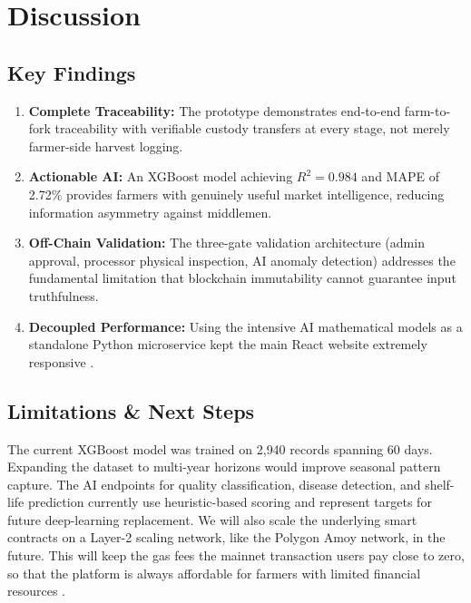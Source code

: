 \documentclass[conference]{IEEEtran}
\begin{document}
\section{Discussion}

\subsection{Key Findings}
\begin{enumerate}
    \item \textbf{Complete Traceability:} The prototype demonstrates end-to-end farm-to-fork traceability with verifiable custody transfers at every stage, not merely farmer-side harvest logging.
    \item \textbf{Actionable AI:} An XGBoost model achieving $R^2 = 0.984$ and MAPE of 2.72\% provides farmers with genuinely useful market intelligence, reducing information asymmetry against middlemen.
    \item \textbf{Off-Chain Validation:} The three-gate validation architecture (admin approval, processor physical inspection, AI anomaly detection) addresses the fundamental limitation that blockchain immutability cannot guarantee input truthfulness.
    \item \textbf{Decoupled Performance:} Using the intensive AI mathematical models as a standalone Python microservice \cite{dragoni2017microservices} kept the main React website extremely responsive \cite{zheng2018blockchain}.
\end{enumerate}

\subsection{Limitations \& Next Steps}
The current XGBoost model was trained on 2{,}940 records spanning 60 days. Expanding the dataset to multi-year horizons would improve seasonal pattern capture. The AI endpoints for quality classification, disease detection, and shelf-life prediction currently use heuristic-based scoring and represent targets for future deep-learning replacement. We will also scale the underlying smart contracts on a Layer-2 scaling network, like the Polygon Amoy network, in the future. This will keep the gas fees the mainnet transaction users pay close to zero, so that the platform is always affordable for farmers with limited financial resources \cite{rejeb2019leveraging}.
\end{document}
